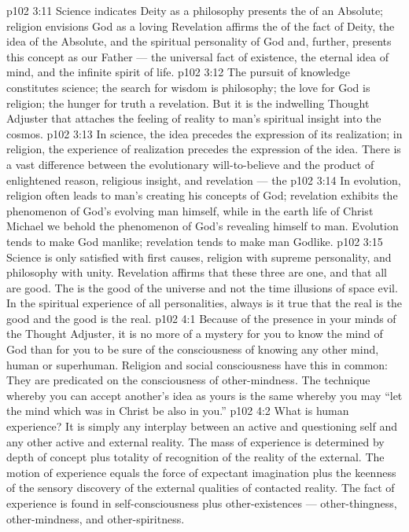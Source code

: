 \vs p102 3:11 Science indicates Deity as a  philosophy presents the  of an Absolute; religion envisions God as a loving  Revelation affirms the  of the fact of Deity, the idea of the Absolute, and the spiritual personality of God and, further, presents this concept as our Father --- the universal fact of existence, the eternal idea of mind, and the infinite spirit of life.
\vs p102 3:12 The pursuit of knowledge constitutes science; the search for wisdom is philosophy; the love for God is religion; the hunger for truth  a revelation. But it is the indwelling Thought Adjuster that attaches the feeling of reality to man’s spiritual insight into the cosmos.
\vs p102 3:13 \pc In science, the idea precedes the expression of its realization; in religion, the experience of realization precedes the expression of the idea. There is a vast difference between the evolutionary will\hyp{}to\hyp{}believe and the product of enlightened reason, religious insight, and revelation --- the 
\vs p102 3:14 In evolution, religion often leads to man’s creating his concepts of God; revelation exhibits the phenomenon of God’s evolving man himself, while in the earth life of Christ Michael we behold the phenomenon of God’s revealing himself to man. Evolution tends to make God manlike; revelation tends to make man Godlike.
\vs p102 3:15 Science is only satisfied with first causes, religion with supreme personality, and philosophy with unity. Revelation affirms that these three are one, and that all are good. The  is the good of the universe and not the time illusions of space evil. In the spiritual experience of all personalities, always is it true that the real is the good and the good is the real.
\vs p102 4:1 Because of the presence in your minds of the Thought Adjuster, it is no more of a mystery for you to know the mind of God than for you to be sure of the consciousness of knowing any other mind, human or superhuman. Religion and social consciousness have this in common: They are predicated on the consciousness of other\hyp{}mindness. The technique whereby you can accept another’s idea as yours is the same whereby you may “let the mind which was in Christ be also in you.”
\vs p102 4:2 What is human experience? It is simply any interplay between an active and questioning self and any other active and external reality. The mass of experience is determined by depth of concept plus totality of recognition of the reality of the external. The motion of experience equals the force of expectant imagination plus the keenness of the sensory discovery of the external qualities of contacted reality. The fact of experience is found in self\hyp{}consciousness plus other\hyp{}existences --- other\hyp{}thingness, other\hyp{}mindness, and other\hyp{}spiritness.
